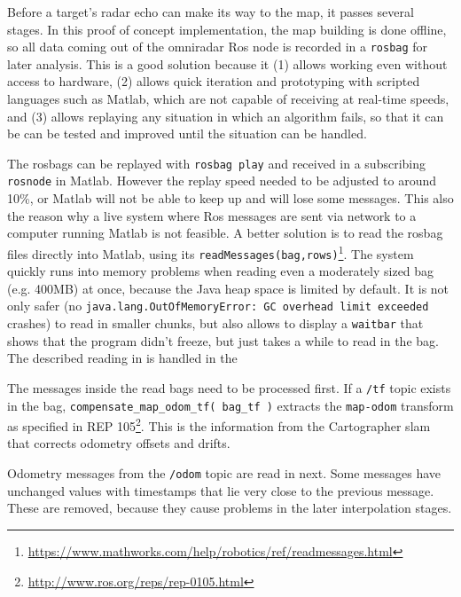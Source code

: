 Before a target's radar echo can make its way to the map, it passes several stages. In this proof of concept implementation, the map building is done offline, so all data coming out of the omniradar Ros node is recorded in a \texttt{rosbag} for later analysis. This is a good solution because it (1) allows working even without access to hardware, (2) allows quick iteration and prototyping with scripted languages such as Matlab, which are not capable of receiving at real-time speeds, and (3) allows replaying any situation in which an algorithm fails, so that it can be can be tested and improved until the situation can be handled.

The rosbags can be replayed with \texttt{rosbag play} and received in a subscribing \texttt{rosnode} in Matlab. However the replay speed needed to be adjusted to around 10\%, or Matlab will not be able to keep up and will lose some messages. This also the reason why a live system where Ros messages are sent via network to a computer running Matlab is not feasible. A better solution is to read the rosbag files directly into Matlab, using its \texttt{readMessages(bag,rows)}\footnote{\url{https://www.mathworks.com/help/robotics/ref/readmessages.html}}. The system quickly runs into memory problems when reading even a moderately sized bag (e.g. 400MB) at once, because the Java heap space is limited by default. It is not only safer (no \texttt{java.lang.OutOfMemoryError: GC overhead limit exceeded} crashes) to read in smaller chunks, but also allows to display a \texttt{waitbar} that shows that the program didn't freeze, but just takes a while to read in the bag. The described reading in is handled in the
\begin{Shaded}
\begin{Highlighting}[]
\end{Highlighting}
\end{Shaded}
The messages inside the read bags need to be processed first. If a \texttt{/tf} topic exists in the bag, \texttt{compensate\_map\_odom\_tf( bag\_tf )} extracts the \texttt{map-odom} transform as specified in REP 105\footnote{\url{http://www.ros.org/reps/rep-0105.html}}. This is the information from the Cartographer slam that corrects odometry offsets and drifts.

Odometry messages from the \texttt{/odom} topic are read in next. Some messages have unchanged values with timestamps that lie very close to the previous message. These are removed, because they cause problems in the later interpolation stages.

